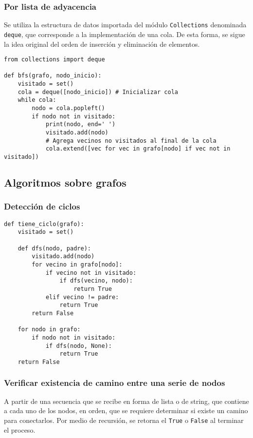 \documentclass[12pt,letterpaper]{article}
\begin{document}
\subsubsection{Por lista de adyacencia}

Se utiliza la estructura de datos importada del módulo \texttt{Collections} denominada \texttt{deque}, que corresponde a la implementación de una cola.
De esta forma, se sigue la idea original del orden de inserción y eliminación de elementos.

\begin{verbatim}
from collections import deque

def bfs(grafo, nodo_inicio):
    visitado = set()
    cola = deque([nodo_inicio]) # Inicializar cola
    while cola:
        nodo = cola.popleft()
        if nodo not in visitado:
            print(nodo, end=' ')
            visitado.add(nodo)
            # Agrega vecinos no visitados al final de la cola
            cola.extend([vec for vec in grafo[nodo] if vec not in visitado])
\end{verbatim}

\subsection{Algoritmos sobre grafos}

\subsubsection{Detección de ciclos}

\begin{verbatim}
def tiene_ciclo(grafo):
    visitado = set()

    def dfs(nodo, padre):
        visitado.add(nodo)
        for vecino in grafo[nodo]:
            if vecino not in visitado:
                if dfs(vecino, nodo):
                    return True
            elif vecino != padre:
                return True
        return False

    for nodo in grafo:
        if nodo not in visitado:
            if dfs(nodo, None):
                return True
    return False
\end{verbatim}

\subsubsection{Verificar existencia de camino entre una serie de nodos}

A partir de una secuencia que se recibe en forma de lista o de string, que contiene a cada uno de los nodos, en orden, que se requiere determinar si existe un camino para conectarlos.
Por medio de recursión, se retorna el \texttt{True} o \texttt{False} al terminar el proceso.
\end{document}
